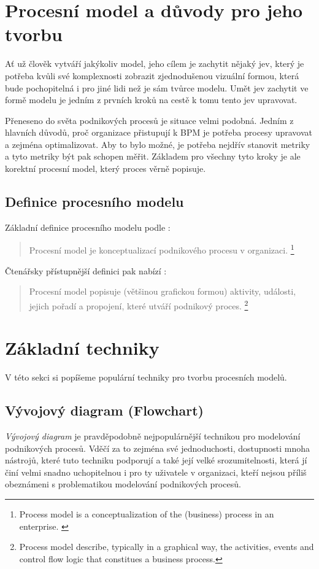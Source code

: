 \section{Procesní model a důvody pro jeho tvorbu}
Ať už člověk vytváří jakýkoliv model, jeho cílem je zachytit nějaký jev, který je potřeba kvůli své komplexnosti zobrazit zjednodušenou vizuální formou, která bude pochopitelná i pro jiné lidi než je sám tvůrce modelu. Umět jev zachytit ve formě modelu je jedním z prvních kroků na cestě k tomu tento jev upravovat.

Přeneseno do světa podnikových procesů je situace velmi podobná. Jedním z hlavních důvodů, proč organizace přistupují k BPM je potřeba procesy upravovat a zejména optimalizovat. Aby to bylo možné, je potřeba nejdřív stanovit metriky a tyto metriky být pak schopen měřit. Základem pro všechny tyto kroky je ale korektní procesní model, který proces věrně popisuje.

\subsection{Definice procesního modelu}
Základní definice procesního modelu podle \cite{Dietz2006}:
\begin{quote}
Procesní model je konceptualizací podnikového procesu v organizaci.
\footnote{Process model is a conceptualization of the (business) process in an enterprise. \cite{Dietz2006}}
\end{quote}
Čtenářsky přístupnější definici pak nabízí \cite{Recker2009}:
\begin{quote}
Procesní model popisuje (většinou grafickou formou) aktivity, události, jejich pořadí a propojení, které utváří podnikový proces.
\footnote{Process model describe, typically in a graphical way, the activities, events and control flow logic that constitues a business process.}
\end{quote}

\section{Základní techniky}
V této sekci si popíšeme populární techniky pro tvorbu procesních modelů.

\subsection{Vývojový diagram (Flowchart)}
\textit{Vývojový diagram} je pravděpodobně nejpopulárnější technikou pro modelování podnikových procesů. Vděčí za to zejména své jednoduchosti, dostupnosti mnoha nástrojů, které tuto techniku podporují a také její velké srozumitelnosti, která jí činí velmi snadno uchopitelnou i pro ty uživatele v organizaci, kteří nejsou příliš obeznámeni s problematikou modelování podnikových procesů.

